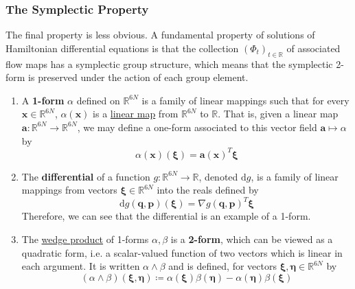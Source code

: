    \subsubsection{The Symplectic Property}

      The final property is less obvious. A fundamental property of solutions of Hamiltonian differential equations is that the collection $(\Phi_t)_{t \in \mathbb{R}}$ of associated flow maps has a symplectic group structure, which means that the symplectic 2-form is preserved under the action of each group element. 
      \begin{enumerate}
        \item A \textbf{1-form} $\alpha$ defined on $\mathbb{R}^{6N}$ is a family of linear mappings such that for every $\mathbf{x} \in \mathbb{R}^{6N}$, $\alpha(\mathbf{x})$ is a \hyperref[lin-def:linear_map]{linear map} from $\mathbb{R}^{6N}$ to $\mathbb{R}$. That is, given a linear map $\mathbf{a}: \mathbb{R}^{6N} \to \mathbb{R}^{6N}$, we may define a one-form associated to this vector field $\mathbf{a} \mapsto \alpha$ by 
        \begin{equation}
          \alpha(\mathbf{x}) (\boldsymbol{\xi}) = \mathbf{a} (\mathbf{x})^T \boldsymbol{\xi}
        \end{equation}
        \item The \textbf{differential} of a function $g: \mathbb{R}^{6N} \to \mathbb{R}$, denoted $\mathrm{d}g$, is a family of linear mappings from vectors $\boldsymbol{\xi} \in \mathbb{R}^{6N}$ into the reals defined by 
        \begin{equation}
          \mathrm{d}g (\mathbf{q}, \mathbf{p}) (\boldsymbol{\xi}) = \nabla g(\mathbf{q}, \mathbf{p})^T \boldsymbol{\xi}
        \end{equation}
        Therefore, we can see that the differential is an example of a 1-form. 
        \item The \hyperref[sm-def:wedge-product]{wedge product} of 1-forms $\alpha, \beta$ is a \textbf{2-form}, which can be viewed as a quadratic form, i.e. a scalar-valued function of two vectors which is linear in each argument. It is written $\alpha \wedge \beta$ and is defined, for vectors $\boldsymbol{\xi}, \boldsymbol{\eta} \in \mathbb{R}^{6N}$ by 
        \begin{equation}
          (\alpha \wedge \beta)(\boldsymbol{\xi}, \boldsymbol{\eta}) \coloneqq \alpha(\boldsymbol{\xi}) \beta(\boldsymbol{\eta}) - \alpha(\boldsymbol{\eta}) \beta(\boldsymbol{\xi})
        \end{equation}
      \end{enumerate}
